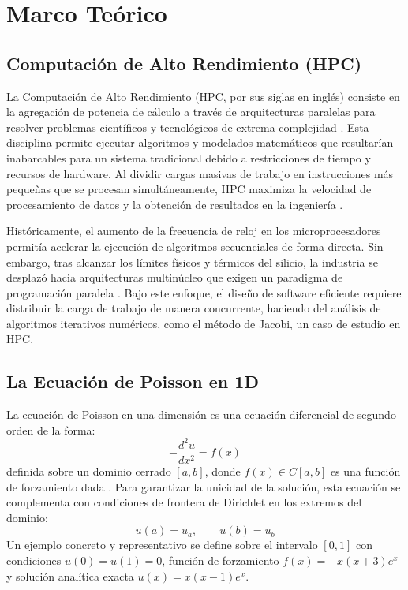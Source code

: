 \section{Marco Teórico}

\subsection{Computación de Alto Rendimiento (HPC)}

La Computación de Alto Rendimiento (HPC, por sus siglas en inglés) consiste en la
agregación de potencia de cálculo a través de arquitecturas paralelas para resolver
problemas científicos y tecnológicos de extrema complejidad \parencite{hager2010hpc}. Esta
disciplina permite ejecutar algoritmos y modelados matemáticos que resultarían
inabarcables para un sistema tradicional debido a restricciones de tiempo y recursos de
hardware. Al dividir cargas masivas de trabajo en instrucciones más pequeñas que se
procesan simultáneamente, HPC maximiza la velocidad de procesamiento de datos y la
obtención de resultados en la ingeniería \parencite{patterson2017computer}.

Históricamente, el aumento de la frecuencia de reloj en los microprocesadores permitía
acelerar la ejecución de algoritmos secuenciales de forma directa. Sin embargo, tras
alcanzar los límites físicos y térmicos del silicio, la industria se desplazó hacia
arquitecturas multinúcleo que exigen un paradigma de programación paralela
\parencite{patterson2017computer}. Bajo este enfoque, el diseño de software eficiente requiere
distribuir la carga de trabajo de manera concurrente, haciendo del análisis de algoritmos
iterativos numéricos, como el método de Jacobi, un caso de estudio en HPC.

\subsection{La Ecuación de Poisson en 1D}

La ecuación de Poisson en una dimensión es una ecuación diferencial de segundo orden de
la forma:
\begin{equation}
    -\frac{d^2u}{dx^2} = f(x)
    \label{eq:poisson_1d}
\end{equation}
definida sobre un dominio cerrado $[a, b]$, donde $f(x) \in C[a, b]$ es una función de
forzamiento dada \parencite{burkardt2011jacobi}. Para garantizar la unicidad de la solución,
esta ecuación se complementa con condiciones de frontera de Dirichlet en los extremos del
dominio:
\begin{equation}
    u(a) = u_a, \qquad u(b) = u_b
    \label{eq:dirichlet}
\end{equation}
Un ejemplo concreto y representativo se define sobre el intervalo $[0, 1]$ con condiciones
$u(0) = u(1) = 0$, función de forzamiento $f(x) = -x(x+3)e^x$ y solución analítica
exacta $u(x) = x(x-1)e^x$.

